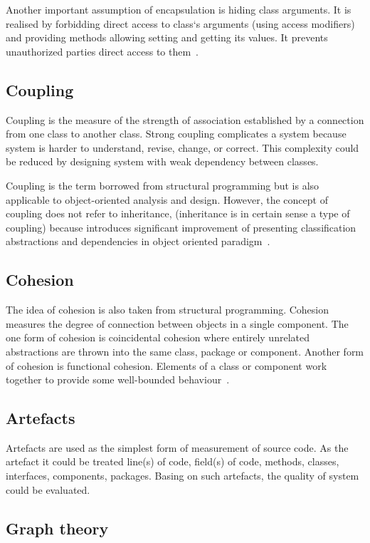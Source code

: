 Another important assumption of encapsulation is hiding class arguments. It is realised by forbidding direct access to class`s arguments (using access modifiers) and providing methods allowing setting and getting its values. It prevents unauthorized parties direct access to them~\cite{SCJP}.

\subsection*{Coupling}
Coupling is the measure of the strength of association established by a connection from one class to another class. Strong coupling complicates a system because system is harder to understand, revise, change, or correct. This complexity could be reduced by designing system with weak dependency between classes.   

Coupling is the term borrowed from structural programming but is also applicable to object-oriented analysis and design. However, the concept of coupling does not refer to inheritance, (inheritance is in certain sense a type of coupling) because introduces significant improvement of presenting classification abstractions and dependencies in object oriented paradigm~\cite{booch}.

\subsection*{Cohesion}
The idea of cohesion is also taken from structural programming. Cohesion measures the degree of connection between objects in a single component. The one form of cohesion is coincidental cohesion where entirely unrelated abstractions are thrown into the same class, package or component. Another form of cohesion is functional cohesion. Elements of a class or component work together to provide some well-bounded behaviour~\cite{booch}.

\subsection*{Artefacts} 
Artefacts are used as the simplest form of measurement of source code. As the artefact it could be treated line(s) of code, field(s) of code, methods, classes, interfaces, components, packages. Basing on such artefacts, the quality of system could be evaluated. 

\subsection*{Graph theory}\label{section:graph_theory}

